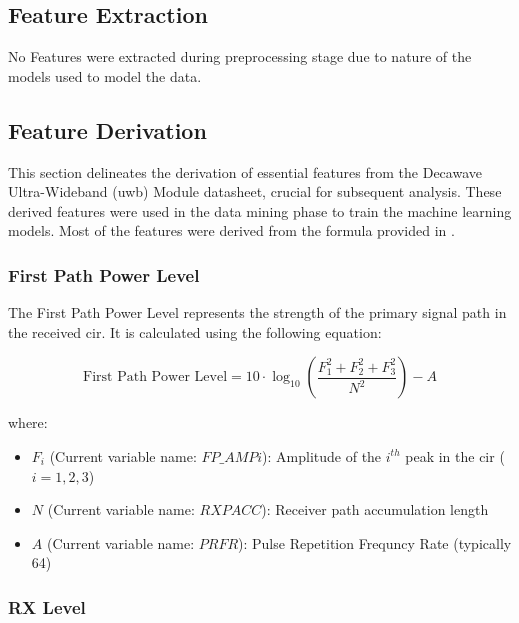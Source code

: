 \subsection{Feature Extraction}\label{feature_extraction}

No Features were extracted during preprocessing stage due to nature of the models used to model the data.


\subsection{Feature Derivation}\label{feature_derivation}

This section delineates the derivation of essential features from the Decawave Ultra-Wideband (\acrshort{uwb}) Module datasheet, crucial for subsequent analysis. These derived features were used in the data mining phase to train the machine learning models. Most of the features were derived from the formula provided in \cite{DecawaveDW1000}.

\subsubsection{First Path Power Level}\label{first_path_power_level}

The First Path Power Level represents the strength of the primary signal path in the received \acrshort{cir}. It is calculated using the following equation:

\begin{equation}
  \text{First Path Power Level} = 10 \cdot \log_{10} \left( \frac{F_1^2 + F_2^2 + F_3^2}{N^2} \right) - A
\end{equation}

where:

\begin{itemize}
  \item $F_i$ (Current variable name: $FP\_AMPi$): Amplitude of the $i^{th}$ peak in the \acrshort{cir} ($i = 1, 2, 3$)
  \item $N$ (Current variable name: $RXPACC$): Receiver path accumulation length
  \item $A$ (Current variable name: $PRFR$): Pulse Repetition Frequncy Rate (typically 64)
\end{itemize}

\subsubsection{RX Level}\label{rx_level}

